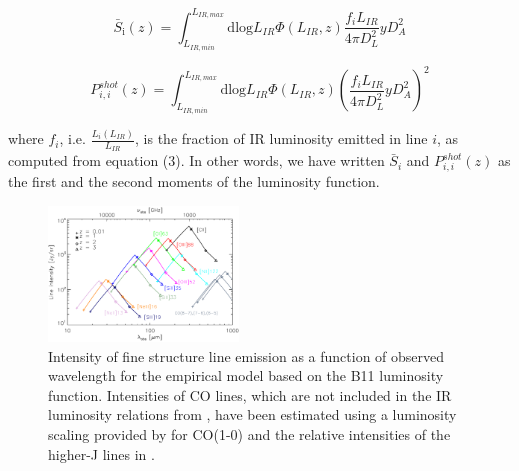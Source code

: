 \documentclass[iop,twocolappendix]{emulateapj}
\begin{document}
\begin{equation} \label{eq:intensity}
\bar{S}_{\mathrm{i}}(z) = \int_{L_{IR,min}}^{L_{IR,max}} \mathrm{dlog}L_{IR}  \Phi(L_{IR}, z) \frac{f_{i} L_{IR} }{4 \pi D_{L}^2} y D_A^2
\end{equation}

\begin{equation} \label{eq:pshotlum}
P_{i,i}^{shot}(z) = \int_{L_{IR,min}}^{L_{IR,max}} \mathrm{dlog}L_{IR}  \Phi(L_{IR}, z) \left(\frac{f_{i} L_{IR}}{4 \pi D_{L}^2} y D_A^2\right)^2
\end{equation}

where $f_{i}$, i.e. $\frac{L_{i}(L_{IR})}{L_{IR}}$, is the fraction of IR luminosity emitted in line $i$, as computed from equation (3). In other words, we have written $\bar{S}_{i}$ and $P_{i,i}^{shot}(z)$ as the first and the second moments of the luminosity function.

\begin{figure}[t]
 \centering
 \includegraphics[width=0.45\textwidth]{interloper_intensity_jysr_withM82CO}
\caption{Intensity of fine structure line emission as a function of observed wavelength for the empirical model based on the B11 luminosity function. Intensities of CO lines, which are not included in the IR luminosity relations from \citet{spinoglio12}, have been estimated using a luminosity scaling provided by \citet{carilli11} for CO(1-0) and the relative intensities of the higher-J lines in \citet{bothwell13}.}
\label{fig:interlopers}
\end{figure}
\end{document}
